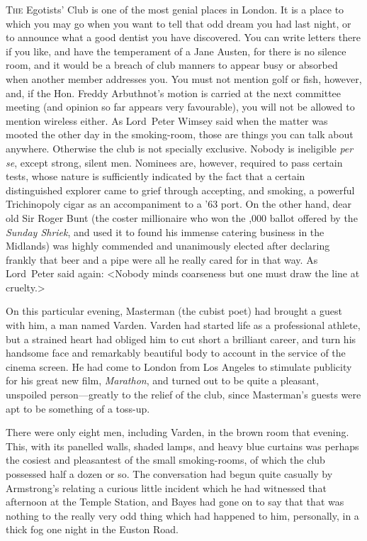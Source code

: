 
\lettrine[lines=4]{T}{he} Egotists' Club is one of the most genial places in London. It is a place to which you may go when you want to tell that odd dream you had last night, or to announce what a good dentist you have discovered. You can write letters there if you like, and have the temperament of a Jane Austen, for there is no silence room, and it would be a breach of club manners to appear busy or absorbed when another member addresses you. You must not mention golf or fish, however, and, if the Hon. Freddy Arbuthnot's motion is carried at the next committee meeting (and opinion so far appears very favourable), you will not be allowed to mention wireless either. As Lord~Peter Wimsey said when the matter was mooted the other day in the smoking-room, those are things you can talk about anywhere. Otherwise the club is not specially exclusive. Nobody is ineligible \textit{per se}, except strong, silent men. Nominees are, however, required to pass certain tests, whose nature is sufficiently indicated by the fact that a certain distinguished explorer came to grief through accepting, and smoking, a powerful Trichinopoly cigar as an accompaniment to a '63 port. On the other hand, dear old Sir Roger Bunt (the coster millionaire who won the ,000 ballot offered by the \textit{Sunday Shriek}, and used it to found his immense catering business in the Midlands) was highly commended and unanimously elected after declaring frankly that beer and a pipe were all he really cared for in that way. As Lord~Peter said again: <Nobody minds coarseness but one must draw the line at cruelty.>

On this particular evening, Masterman (the cubist poet) had brought a guest with him, a man named Varden. Varden had started life as a professional athlete, but a strained heart had obliged him to cut short a brilliant career, and turn his handsome face and remarkably beautiful body to account in the service of the cinema screen. He had come to London from Los Angeles to stimulate publicity for his great new film, \textit{Marathon}, and turned out to be quite a pleasant, unspoiled person—greatly to the relief of the club, since Masterman's guests were apt to be something of a toss-up.

There were only eight men, including Varden, in the brown room that evening. This, with its panelled walls, shaded lamps, and heavy blue curtains was perhaps the cosiest and pleasantest of the small smoking-rooms, of which the club possessed half a dozen or so. The conversation had begun quite casually by Armstrong's relating a curious little incident which he had witnessed that afternoon at the Temple Station, and Bayes had gone on to say that that was nothing to the really very odd thing which had happened to him, personally, in a thick fog one night in the Euston Road.

